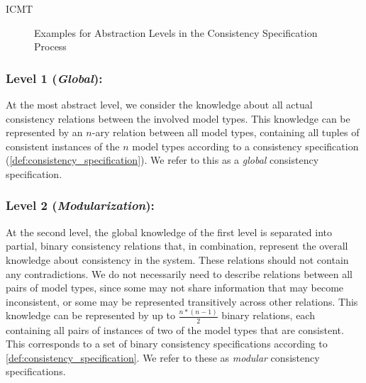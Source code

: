 \begin{copiedFrom}{ICMT}
\begin{figure}
    \centering
    
    \caption{Examples for Abstraction Levels in the Consistency Specification Process}
    \label{fig:properties:levels_overview}
\end{figure}


\subsubsection*{Level 1 (\emph{Global}):}
At the most abstract level, we consider the knowledge about all actual consistency relations between the involved model types.
This knowledge can be represented by an $n$-ary relation between all model types, containing all tuples of consistent instances of the $n$ model types according to a consistency specification (\autoref{def:consistency_specification}). 
We refer to this as a \emph{global} consistency specification.

\subsubsection*{Level 2 (\emph{Modularization}):} 
At the second level, the global knowledge of the first level is separated into partial, binary consistency relations that, in combination, represent the overall knowledge about consistency in the system.
These relations should not contain any contradictions.
We do not necessarily need to describe relations between all pairs of model types, since some may not share information that may become inconsistent, or some may be represented transitively across other relations.
This knowledge 
can be represented by up to $\frac{n*(n-1)}{2}$ binary relations, each containing all pairs of instances of two of the model types that are consistent.
This corresponds to a set of binary consistency specifications according to \autoref{def:consistency_specification}.
We refer to these as \emph{modular} consistency specifications.\\[-1em]


\end{copiedFrom}
